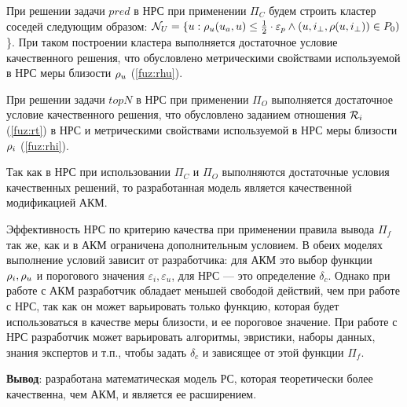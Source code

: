 При решении задачи $pred$ в НРС при применении $\Pi_C$
будем строить кластер соседей следующим образом:
$\mathcal{N}_U = \{ u : \mathcal{\rho}_u(u_a, u) \le \frac{1}{2} \cdot \varepsilon_p \wedge
(u, i_{\bot}, \rho(u, i_{\bot})) \in P_0)$ \}.
При таком построении кластера выполняется
достаточное условие качественного решения,
что обусловлено
метрическими свойствами используемой в НРС
меры близости $\mathcal{\rho}_u$ (\ref{fuz:rhu}).


При решении задачи $topN$ в НРС при применении $\Pi_O$
выполняется достаточное условие качественного решения,
что обусловлено заданием отношения $\mathcal{R}_i$ (\ref{fuz:rt})
в НРС и метрическими свойствами используемой в
НРС меры близости $\mathcal{\rho}_i$ (\ref{fuz:rhi}).

Так как в НРС при использовании $\Pi_C$ и $\Pi_O$
выполняются достаточные условия качественных решений, то
разработанная модель является качественной модификацией АКМ.

Эффективность НРС по критерию качества при применении правила
вывода $\Pi_f$ так же, как и в АКМ ограничена
дополнительным условием.
В обеих моделях выполнение условий
зависит от разработчика: для АКМ это выбор функции $\mathcal{\rho}_i, \mathcal{\rho}_u$ и порогового
значения $\varepsilon_i, \varepsilon_u$, для НРС --- это
определение $\delta_c$.
Однако при работе с АКМ
разработчик обладает меньшей свободой действий, чем при работе с
НРС, так как он может варьировать только функцию, которая будет
использоваться в качестве меры близости, и ее пороговое значение.
При работе с НРС разработчик может варьировать
алгоритмы, эвристики, наборы данных, знания
экспертов и т.п., чтобы задать $\delta_c$ и зависящее от этой функции $\Pi_f$.

{\bf Вывод}: разработана математическая модель РС, которая теоретически
более качественна, чем АКМ, и является ее расширением.
